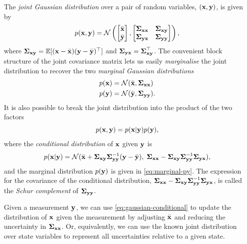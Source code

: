 The \emph{joint Gaussian distribution} over a pair of random variables, $(\vecx, \vecy)$, is given by
\begin{equation}
  p(\vecx, \vecy) = \cN \left(
  \begin{bmatrix}
    \bar{\vecx}\\
    \bar{\vecy}
  \end{bmatrix},
   \begin{bmatrix}
    \matSigma_{\vecx\vecx} & \matSigma_{\vecx\vecy}\\
    \matSigma_{\vecy\vecx} & \matSigma_{\vecy\vecy}
  \end{bmatrix} 
  \right),
\end{equation}
where $\matSigma_{\vecx\vecy} = \bbE [(\vecx - \bar{\vecx}) (\vecy - \bar{\vecy})\trans]$ and $\matSigma_{\vecy\vecx} = \matSigma_{\vecx\vecy}\trans$.
The convenient block structure of the joint covariance matrix lets us easily \emph{marginalise} the joint distribution to recover the two \emph{marginal Gaussian distributions}
\begin{align}
  p(\vecx) &= \cN(\bar{\vecx}, \matSigma_{\vecx\vecx})\\
  p(\vecy) &= \cN(\bar{\vecy}, \matSigma_{\vecy\vecy}). \label{eq:marginal-py}
\end{align}
It is also possible to break the joint distribution into the product of the two factors
\begin{equation}
  p(\vecx, \vecy) = p(\vecx | \vecy) p(\vecy),
\end{equation}
where the \emph{conditional distribution} of $\vecx$ given $\vecy$ is
\begin{equation} \label{eq:gaussian-conditional}
  p(\vecx | \vecy) = \cN(\bar{\vecx} + \matSigma_{\vecx\vecy}\matSigma_{\vecy\vecy}^{-1}(\vecy - \bar{\vecy}),\; \matSigma_{\vecx\vecx} - \matSigma_{\vecx\vecy}\matSigma_{\vecy\vecy}^{-1}\matSigma_{\vecy\vecx}),
\end{equation}
and the marginal distribution $p(\vecy)$ is given in \eqref{eq:marginal-py}.
The expression for the covariance of the conditional distribution, $\matSigma_{\vecx\vecx} - \matSigma_{\vecx\vecy}\matSigma_{\vecy\vecy}^{-1}\matSigma_{\vecy\vecx}$, is called the \emph{Schur complement} of $\matSigma_{\vecy\vecy}$.

Given a measurement $\vecy$, we can use \eqref{eq:gaussian-conditional} to update the distribution of $\vecx$ given the measurement by adjusting $\bar{\vecx}$ and reducing the uncertainty in $\matSigma_{\vecx\vecx}$. 
Or, equivalently, we can use the known joint distribution over state variables to represent all uncertainties relative to a given state.

